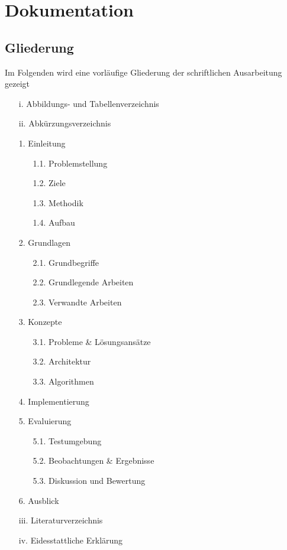 \documentclass[11pt]{article}
\begin{document}
    \newpage

    \section{Dokumentation}
    \subsection{Gliederung}
    Im Folgenden wird eine vorläufige Gliederung der schriftlichen Ausarbeitung gezeigt
    \begin{itemize}
        \item[i.] Abbildungs- und Tabellenverzeichnis
        \item[ii.] Abkürzungsverzeichnis
        \item[1.] Einleitung
        \begin{itemize}
            \item[1.1.] Problemstellung
            \item[1.2.] Ziele
            \item[1.3.] Methodik
            \item[1.4.] Aufbau
        \end{itemize}
        \item[2.] Grundlagen
        \begin{itemize}
            \item[2.1.] Grundbegriffe
            \item[2.2.] Grundlegende Arbeiten
            \item[2.3.] Verwandte Arbeiten
        \end{itemize}
        \item[3.] Konzepte
        \begin{itemize}
            \item[3.1.] Probleme \& Lösungsansätze
            \item[3.2.] Architektur
            \item[3.3.] Algorithmen
        \end{itemize}
        \item[4.] Implementierung
        \item[5.] Evaluierung
        \begin{itemize}
            \item[5.1.] Testumgebung
            \item[5.2.] Beobachtungen \& Ergebnisse
            \item[5.3.] Diskussion und Bewertung
        \end{itemize}
        \item[6.] Ausblick
        \item[iii.] Literaturverzeichnis
        \item[iv.] Eidesstattliche Erklärung
    \end{itemize}
\end{document}
